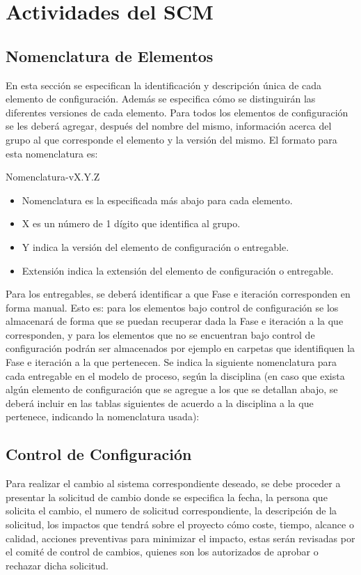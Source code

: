 
\chapter{Actividades del SCM}
\section{Nomenclatura de Elementos}
\label{intro}
En esta sección se especifican la identificación y descripción única de cada elemento de configuración.
Además se especifica cómo se distinguirán las diferentes versiones de cada elemento.
Para todos los elementos de configuración se les deberá agregar, después del nombre del mismo, información acerca del grupo al que corresponde el elemento y la versión del mismo.
El formato para esta nomenclatura es:


Nomenclatura-vX.Y.Z

\begin{itemize}
\item Nomenclatura es la especificada más abajo para cada elemento.
\item X es un número de 1 dígito que identifica al grupo.
\item Y indica la versión del elemento de configuración o entregable.
\item Extensión indica la extensión del elemento de configuración o entregable.
\end{itemize}


Para los entregables, se deberá identificar a que Fase e iteración corresponden en forma manual. Esto es: para los elementos bajo control de configuración se los almacenará de forma que se puedan recuperar dada la Fase e iteración a la que corresponden, y para los elementos que no se encuentran bajo control de configuración podrán ser almacenados por ejemplo en carpetas que identifiquen la Fase e iteración a la que pertenecen.
Se indica la siguiente nomenclatura para cada entregable en el modelo de proceso, según la disciplina (en caso que exista algún elemento de configuración que se agregue a los que se detallan abajo, se deberá incluir en las tablas siguientes de acuerdo a la disciplina a la que pertenece, indicando la nomenclatura usada):


\section{Control de Configuración}
\label{intro}
Para realizar el cambio al sistema correspondiente deseado, se debe proceder a presentar la solicitud de cambio donde se especifica la fecha, la persona que solicita el cambio, el numero de solicitud 
correspondiente, la descripción de la solicitud, los impactos que tendrá sobre el proyecto cómo 
coste, tiempo, alcance o calidad, acciones preventivas para minimizar el impacto, estas serán revisadas por el comité de control de cambios, quienes son los autorizados de aprobar o rechazar dicha solicitud.



